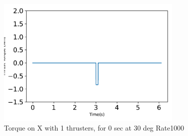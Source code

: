 \begin{figure}[htbp]\centerline{\includegraphics[width=0.8\textwidth]{AutoTeX/Torque_1Thrusters_0s_30deg_Loc2_Rate1000}}\caption{Torque on X with 1 thrusters, for 0 sec at 30 deg Rate1000}\label{fig:Torque_1Thrusters_0s_30deg_Loc2_Rate1000}\end{figure}